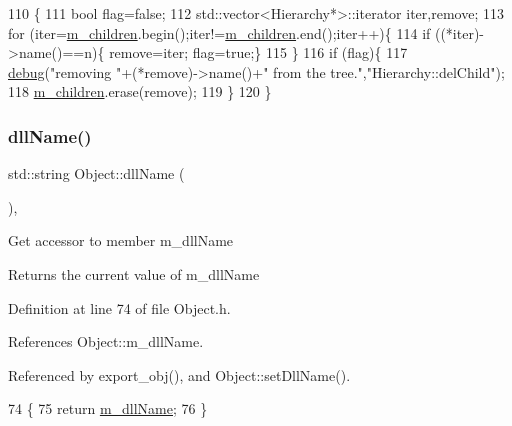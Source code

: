 \begin{DoxyCode}
110                                    \{
111   \textcolor{keywordtype}{bool} flag=\textcolor{keyword}{false};
112   std::vector<Hierarchy*>::iterator iter,\textcolor{keyword}{remove};
113   \textcolor{keywordflow}{for} (iter=\hyperlink{classHierarchy_a038816763941fd4a930504917f60483b}{m\_children}.begin();iter!=\hyperlink{classHierarchy_a038816763941fd4a930504917f60483b}{m\_children}.end();iter++)\{
114     \textcolor{keywordflow}{if} ((*iter)->name()==n)\{ \textcolor{keyword}{remove}=iter; flag=\textcolor{keyword}{true};\}
115   \}
116   \textcolor{keywordflow}{if} (flag)\{
117     \hyperlink{classObject_aac010553f022165573714b7014a15f0d}{debug}(\textcolor{stringliteral}{"removing "}+(*remove)->name()+\textcolor{stringliteral}{" from the tree."},\textcolor{stringliteral}{"Hierarchy::delChild"});
118     \hyperlink{classHierarchy_a038816763941fd4a930504917f60483b}{m\_children}.erase(\textcolor{keyword}{remove});
119   \}
120 \}
\end{DoxyCode}
\mbox{\label{classObject_a2e3947f2870094c332d7454117f3ec63}} 
\subsubsection{\texorpdfstring{dll\+Name()}{dllName()}}
{\footnotesize\ttfamily std\+::string Object\+::dll\+Name (\begin{DoxyParamCaption}{ }\end{DoxyParamCaption})\hspace{0.3cm}{\ttfamily [inline]}, {\ttfamily [inherited]}}

Get accessor to member m\+\_\+dll\+Name \begin{DoxyReturn}{Returns}
the current value of m\+\_\+dll\+Name 
\end{DoxyReturn}


Definition at line 74 of file Object.\+h.



References Object\+::m\+\_\+dll\+Name.



Referenced by export\+\_\+obj(), and Object\+::set\+Dll\+Name().


\begin{DoxyCode}
74                        \{
75     \textcolor{keywordflow}{return} \hyperlink{classObject_a01afbeacebb8db6831559972ec362eb3}{m\_dllName};
76   \}  
\end{DoxyCode}
\mbox{\label{classA3PE_a60a510251ec2b5fd800af2ba88e9fdac}} 
